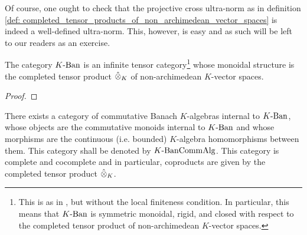            \begin{remark}
                Of course, one ought to check that the projective cross ultra-norm as in definition \ref{def: completed_tensor_products_of_non_archimedean_vector_spaces} is indeed a well-defined ultra-norm. This, however, is easy and as such will be left to our readers as an exercise.  
            \end{remark}
            \begin{proposition} \label{prop: completed_tensor_products_of_non_archimedean_banach_spaces}
                The category $K\text{-}\mathrm{Ban}$ is an infinite tensor category\footnote{This is as in \cite[Definition 4.1.1]{EGNO}, but without the local finiteness condition. In particular, this means that $K\text{-}\mathrm{Ban}$ is symmetric monoidal, rigid, and closed with respect to the completed tensor product of non-archimedean $K$-vector spaces.} whose monoidal structure is the completed tensor product $\hattensor_K$ of non-archimedean $K$-vector spaces.
            \end{proposition}
                \begin{proof}
                    
                \end{proof}
            \begin{corollary}
                There exists a category of commutative Banach $K$-algebras internal to $K\text{-}\mathrm{Ban}$, whose objects are the commutative monoids internal to $K\text{-}\mathrm{Ban}$ and whose morphisms are the continuous (i.e. bounded) $K$-algebra homomorphisms between them. This category shall be denoted by $K\text{-}\mathrm{Ban}\mathrm{Comm}\mathrm{Alg}$. This category is complete and cocomplete and in particular, coproducts are given by the completed tensor product $\hattensor_K$.
            \end{corollary}
            
